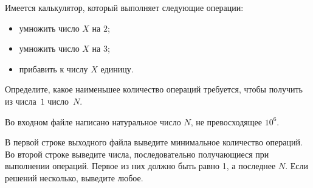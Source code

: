 

Имеется калькулятор, который выполняет следующие операции:
	\begin{itemize}
	\item умножить число $X$ на $2$;
	\item умножить число $X$ на $3$;
	\item прибавить к числу $X$ единицу.
	\end{itemize}

Определите, какое наименьшее количество операций требуется, чтобы получить из числа~$1$ число~$N$.

\InputFile
Во входном файле написано натуральное число $N$, не превосходящее $10^6$.

\OutputFile
В первой строке выходного файла выведите минимальное количество операций. Во второй строке выведите числа, последовательно получающиеся при выполнении операций. Первое из них должно быть равно 1, а последнее $N$. Если решений несколько, выведите любое.


